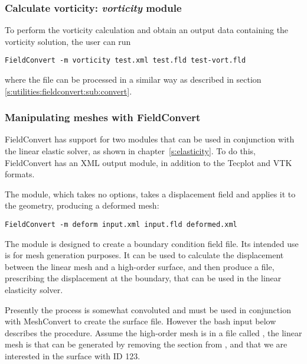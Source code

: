 %
%
%
\subsubsection{Calculate vorticity: \textit{vorticity} module}
To perform the vorticity calculation and obtain an output 
data containing the vorticity solution, the user can run
\begin{lstlisting}[style=BashInputStyle]
FieldConvert -m vorticity test.xml test.fld test-vort.fld
\end{lstlisting}
where the file  can be processed in a similar 
way as described in section \ref{s:utilities:fieldconvert:sub:convert}.
%
%
%
\subsubsection{Manipulating meshes with FieldConvert}
FieldConvert has support for two modules that can be used in conjunction with
the linear elastic solver, as shown in chapter~\ref{s:elasticity}. To do this,
FieldConvert has an XML output module, in addition to the Tecplot and VTK
formats.

The  module, which takes no options, takes a displacement field
and applies it to the geometry, producing a deformed mesh:
\begin{lstlisting}[style=BashInputStyle]
FieldConvert -m deform input.xml input.fld deformed.xml
\end{lstlisting}

The  module is designed to create a boundary condition field
file. Its intended use is for mesh generation purposes. It can be used to
calculate the displacement between the linear mesh and a high-order surface, and
then produce a  file, prescribing the displacement at the boundary,
that can be used in the linear elasticity solver.

Presently the process is somewhat convoluted and must be used in conjunction
with MeshConvert to create the surface file. However the bash input below
describes the procedure. Assume the high-order mesh is in a file called
, the linear mesh is  that can be
generated by removing the  section from , and that
we are interested in the surface with ID 123.

